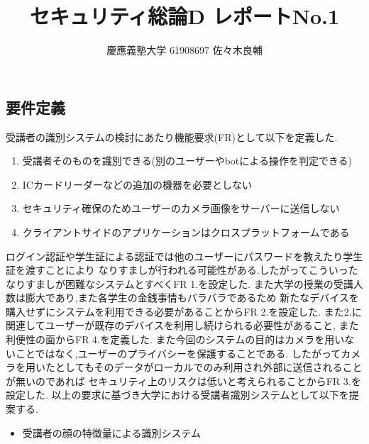 \documentclass[uplatex,a4j,11pt,dvipdfmx]{jsarticle}
\begin{document}
\title{セキュリティ総論D レポートNo.1}
\author{慶應義塾大学 61908697 佐々木良輔}
\date{}
\maketitle
\subsection*{要件定義}
受講者の識別システムの検討にあたり機能要求(FR)として以下を定義した.
\begin{enumerate}[FR 1.]
  \item 受講者そのものを識別できる(別のユーザーやbotによる操作を判定できる)
  \item ICカードリーダーなどの追加の機器を必要としない
  \item セキュリティ確保のためユーザーのカメラ画像をサーバーに送信しない
  \item クライアントサイドのアプリケーションはクロスプラットフォームである
\end{enumerate}
ログイン認証や学生証による認証では他のユーザーにパスワードを教えたり学生証を渡すことにより
なりすましが行われる可能性がある.したがってこういったなりすましが困難なシステムとすべくFR 1.を設定した.
また大学の授業の受講人数は膨大であり,また各学生の金銭事情もバラバラであるため
新たなデバイスを購入せずにシステムを利用できる必要があることからFR 2.を設定した.
また2.に関連してユーザーが既存のデバイスを利用し続けられる必要性があること,
また利便性の面からFR 4.を定義した.
また今回のシステムの目的はカメラを用いないことではなく,ユーザーのプライバシーを保護することである.
したがってカメラを用いたとしてもそのデータがローカルでのみ利用され外部に送信されることが無いのであれば
セキュリティ上のリスクは低いと考えられることからFR 3.を設定した.
以上の要求に基づき大学における受講者識別システムとして以下を提案する.
\begin{itemize}
  \item 受講者の顔の特徴量による識別システム
\end{itemize}
\end{document}
